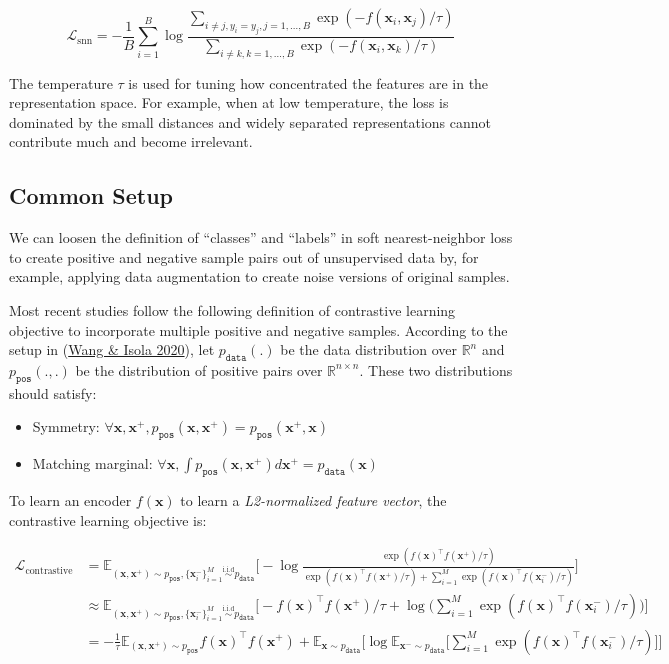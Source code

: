\documentclass[12pt]{article}
\begin{document}
\[
\mathcal{L}_\text{snn} = -\frac{1}{B}\sum_{i=1}^B \log \frac{\sum_{i\neq j, y_i = y_j, j=1,\dots,B} \exp(- f(\mathbf{x}_i, \mathbf{x}_j) / \tau)}{\sum_{i\neq k, k=1,\dots,B} \exp(- f(\mathbf{x}_i, \mathbf{x}_k) /\tau)}
\]

The temperature $\tau$ is used for tuning how concentrated the features are in the representation space. For example, when at low temperature, the loss is dominated by the small distances and widely separated representations cannot contribute much and become irrelevant.

\subsection{Common Setup}

We can loosen the definition of ``classes'' and ``labels'' in soft nearest-neighbor loss to create positive and negative sample pairs out of unsupervised data by, for example, applying data augmentation to create noise versions of original samples.

Most recent studies follow the following definition of contrastive learning objective to incorporate multiple positive and negative samples. According to the setup in (\href{https://arxiv.org/abs/2005.10242}{Wang \& Isola 2020}), let $p_\texttt{data}(.)$ be the data distribution over $\mathbb{R}^n$ and $p_\texttt{pos}(., .)$ be the distribution of positive pairs over $\mathbb{R}^{n \times n}$. These two distributions should satisfy:
\begin{itemize}
    \item Symmetry: $\forall \mathbf{x}, \mathbf{x}^+, p_\texttt{pos}(\mathbf{x}, \mathbf{x}^+) = p_\texttt{pos}(\mathbf{x}^+, \mathbf{x})$
    \item Matching marginal: $\forall \mathbf{x}, \int p_\texttt{pos}(\mathbf{x}, \mathbf{x}^+) d\mathbf{x}^+ = p_\texttt{data}(\mathbf{x})$
\end{itemize}

To learn an encoder $f(\mathbf{x})$ to learn a \emph{L2-normalized feature vector}, the contrastive learning objective is:

\[
\begin{aligned}
\mathcal{L}_\text{contrastive} 
&= \mathbb{E}_{(\mathbf{x},\mathbf{x}^+)\sim p_\texttt{pos}, \{\mathbf{x}^-_i\}^M_{i=1} \overset{\text{i.i.d}}{\sim} p_\texttt{data} } \Big[ -\log\frac{\exp(f(\mathbf{x})^\top f(\mathbf{x}^+) / \tau)}{ \exp(f(\mathbf{x})^\top f(\mathbf{x}^+) / \tau) + \sum_{i=1}^M \exp(f(\mathbf{x})^\top f(\mathbf{x}_i^-) / \tau)} \Big] \\
&\approx \mathbb{E}_{(\mathbf{x},\mathbf{x}^+)\sim p_\texttt{pos}, \{\mathbf{x}^-_i\}^M_{i=1} \overset{\text{i.i.d}}{\sim} p_\texttt{data} }\Big[ - f(\mathbf{x})^\top f(\mathbf{x}^+) / \tau + \log\big(\sum_{i=1}^M \exp(f(\mathbf{x})^\top f(\mathbf{x}_i^-) / \tau)\big) \Big] \\
&= -\frac{1}{\tau}\mathbb{E}_{(\mathbf{x},\mathbf{x}^+)\sim p_\texttt{pos}}f(\mathbf{x})^\top f(\mathbf{x}^+) + \mathbb{E}_{ \mathbf{x} \sim p_\texttt{data}} \Big[ \log \mathbb{E}_{\mathbf{x}^- \sim p_\texttt{data}} \big[ \sum_{i=1}^M \exp(f(\mathbf{x})^\top f(\mathbf{x}_i^-) / \tau)\big] \Big]
\end{aligned}
\]
\end{document}
